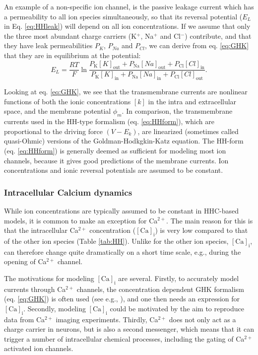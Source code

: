 An example of a non-specific ion channel, is the passive leakage current which has a permeability to all ion species simultaneously, so that its reversal potential ($E_L$ in Eq. \ref{eq:HHleak}) will depend on all ion concentrations. If we assume that only the three most abundant charge carriers (K$^{+}$, Na$^{+}$ and Cl$^{-}$) contribute, and that they have leak permeabilities $P_K$, $P_{Na}$ and $P_{Cl}$, we can derive from eq. \ref{eq:GHK} that they are in equilibrium at the potential:
\begin{equation}
E_L = \frac{R T}{F} 
\ln \frac{P_\text{K} [K]_\text{out}+P_\text{Na} [Na]_\text{out} + P_\text{Cl} [Cl]_\text{in}}
           {P_\text{K} [K]_\text{in}+P_\text{Na} [Na]_\text{in} + P_\text{Cl} [Cl]_\text{out}}.
\label{eq:Eleak_GHK}
\end{equation}

Looking at eq. \ref{eq:GHK}, we see that the transmembrane currents are nonlinear functions of both the ionic concentrations $[k]$ in the intra and extracellular space, and the membrane potential $\phi_m$. In comparison, the transmembrane currents used in the HH-type formalism (eq. \ref{eq:HHform}), which are proportional to the driving force $(V-E_k)$, are linearized (sometimes called quasi-Ohmic) versions of the Goldman-Hodkgkin-Katz equation. The HH-form (eq. \ref{eq:HHform}) is generally deemed as sufficient for modeling most ion channels, because it gives good predictions of the membrane currents. Ion concentrations and ionic reversal potentials are assumed to be constant.


\subsubsection{Intracellular Calcium dynamics}
While ion concentrations are typically assumed to be constant in HHC-based models, it is common to make an exception for Ca$^{2+}$. The main reason for this is that the intracellular Ca$^{2+}$ concentration ($\mathrm{[Ca]_i}$) is very low compared to that of the other ion species (Table \ref{tab:HH}). Unlike for the other ion species,  $\mathrm{[Ca]_i}$, can therefore change quite dramatically on a short time scale, e.g., during the opening of Ca$^{2+}$ channel. 

The motivations for modeling $\mathrm{[Ca]_i}$ are several. Firstly, to accurately model currents through Ca$^{2+}$ channels, the concentration dependent GHK formalism (eq. \ref{eq:GHK}) is often used (see e.g., \cite{Destexhe1994, Zhu1999, Halnes2011}), and one then needs an expression for $\mathrm{[Ca]_i}$. Secondly, modeling $\mathrm{[Ca]_i}$ could be motivated by the aim to reproduce data from Ca$^{2+}$ imaging experiments. Thirdly, Ca$^{2+}$ does not only act as a charge carrier in neurons, but is also a second messenger, which means that it can trigger a number of intracellular chemical processes, including the gating of Ca$^{2+}$ activated ion channels. 

